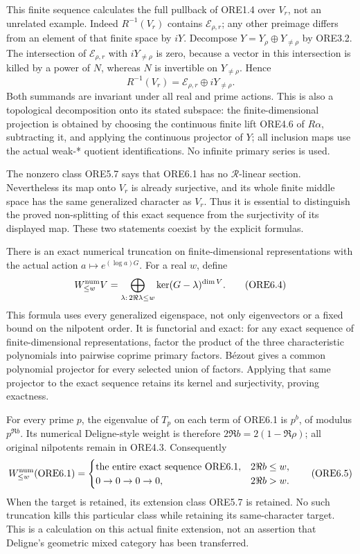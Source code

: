 This finite sequence calculates the full pullback of ORE1.4 over
\(V_r\), not an unrelated example. Indeed \(R^{-1}(V_r)\) contains
\(\mathcal E_{\rho,r}\); any other preimage differs from an element of
that finite space by \(iY\). Decompose \(Y=Y_\rho\oplus Y_{\ne\rho}\) by
ORE3.2. The intersection of \(\mathcal E_{\rho,r}\) with
\(iY_{\ne\rho}\) is zero, because a vector in this intersection is
killed by a power of \(N\), whereas \(N\) is invertible on
\(Y_{\ne\rho}\). Hence \[
\boxed{R^{-1}(V_r)=\mathcal E_{\rho,r}\oplus iY_{\ne\rho}.}
\tag{ORE6.3}
\] Both summands are invariant under all real and prime actions. This is
also a topological decomposition onto its stated subspace: the
finite-dimensional projection is obtained by choosing the continuous
finite lift ORE4.6 of \(R\alpha\), subtracting it, and applying the
continuous projector of \(Y\); all inclusion maps use the actual weak-*
quotient identifications. No infinite primary series is used.

The nonzero class ORE5.7 says that ORE6.1 has no \(\mathcal R\)-linear
section. Nevertheless its map onto \(V_r\) is already surjective, and
its whole finite middle space has the same generalized character as
\(V_r\). Thus it is essential to distinguish the proved non-splitting of
this exact sequence from the surjectivity of its displayed map. These
two statements coexist by the explicit formulas.

There is an exact numerical truncation on finite-dimensional
representations with the actual action \(a\mapsto e^{(\log a)G}\). For a
real \(w\), define \[
W_{\le w}^{\rm num}V
=\bigoplus_{\lambda:\,2\Re\lambda\le w}
\ker(G-\lambda)^{\dim V}.
\tag{ORE6.4}
\] This formula uses every generalized eigenspace, not only eigenvectors
or a fixed bound on the nilpotent order. It is functorial and exact: for
any exact sequence of finite-dimensional representations, factor the
product of the three characteristic polynomials into pairwise coprime
primary factors. Bézout gives a common polynomial projector for every
selected union of factors. Applying that same projector to the exact
sequence retains its kernel and surjectivity, proving exactness.

For every prime \(p\), the eigenvalue of \(T_p\) on each term of ORE6.1
is \(p^b\), of modulus \(p^{\Re b}\). Its numerical Deligne-style weight
is therefore \(2\Re b=2(1-\Re\rho)\); all original nilpotents remain in
ORE4.3. Consequently \[
W_{\le w}^{\rm num}(\text{ORE6.1})=
\begin{cases}
\text{the entire exact sequence ORE6.1},&
2\Re b\le w,\\
0\to0\to0\to0,&2\Re b>w.
\end{cases}
\tag{ORE6.5}
\] When the target is retained, its extension class ORE5.7 is retained.
No such truncation kills this particular class while retaining its
same-character target. This is a calculation on this actual finite
extension, not an assertion that Deligne's geometric mixed category has
been transferred.

